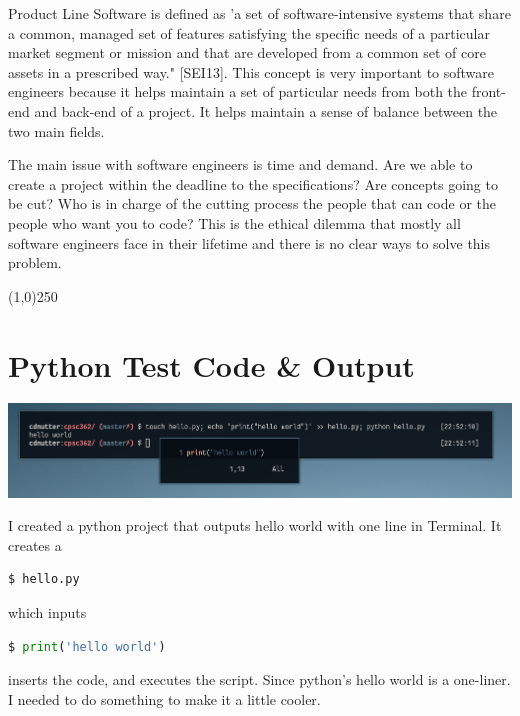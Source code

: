 \documentclass[12pt,a4paper]{article}
\begin{document}
    Product Line Software is defined as 'a set of software-intensive systems that share a common, managed set of features satisfying the specific needs of a particular market segment or mission and that are developed from a common set of core assets in a prescribed way." [SEI13]. This concept is very important to software engineers because it helps maintain a set of particular needs from both the front-end and back-end of a project. It helps maintain a sense of balance between the two main fields.\par 
    The main issue with software engineers is time and demand. Are we able to create a project within the deadline to the specifications? Are concepts going to be cut? Who is in charge of the cutting process the people that can code or the people who want you to code? This is the ethical dilemma that mostly all software engineers face in their lifetime and there is no clear ways to solve this problem.
    \begin{center}\line(1,0){250}\end{center}


\section{Python Test Code \& Output}
   \begin{center}\includegraphics[width=13.8cm]{python-test.png}\end{center}
    I created a python project that outputs hello world with one line in Terminal. 
    It creates a
    \begin{lstlisting}[language=bash]
        $ hello.py
    \end{lstlisting}
    which inputs
    \begin{lstlisting}[language=Python] 
        $ print('hello world') 
    \end{lstlisting} inserts the code, and executes the script. Since python's hello world is a one-liner. I needed to do something to make it a little cooler. 
\end{document}
